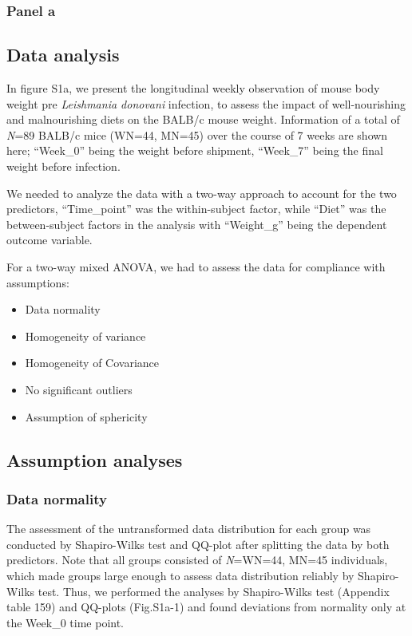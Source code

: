 \documentclass[
  12pt,
  letterpaper,
]{article}
\providecommand{\tightlist}{%
  \setlength{\itemsep}{0pt}\setlength{\parskip}{0pt}}
\begin{document}
\subsubsection{Panel a}\label{panel-a-3}

\subsection{Data analysis}\label{data-analysis-10}

In figure S1a, we present the longitudinal weekly observation of mouse body weight pre \emph{Leishmania donovani} infection, to assess the impact of well-nourishing and malnourishing diets on the BALB/c mouse weight. Information of a total of \emph{N}=89 BALB/c mice (WN=44, MN=45) over the course of 7 weeks are shown here; ``Week\_0'' being the weight before shipment, ``Week\_7'' being the final weight before infection.

We needed to analyze the data with a two-way approach to account for the two predictors, ``Time\_point'' was the within-subject factor, while ``Diet'' was the between-subject factors in the analysis with ``Weight\_g'' being the dependent outcome variable.

For a two-way mixed ANOVA, we had to assess the data for compliance with assumptions:

\begin{itemize}
\tightlist
\item
  Data normality
\item
  Homogeneity of variance
\item
  Homogeneity of Covariance
\item
  No significant outliers
\item
  Assumption of sphericity
\end{itemize}

\subsection{Assumption analyses}\label{assumption-analyses-6}

\subsubsection{Data normality}\label{data-normality-6}

The assessment of the untransformed data distribution for each group was conducted by Shapiro-Wilks test and QQ-plot after splitting the data by both predictors. Note that all groups consisted of \emph{N}=WN=44, MN=45 individuals, which made groups large enough to assess data distribution reliably by Shapiro-Wilks test. Thus, we performed the analyses by Shapiro-Wilks test (Appendix table 159) and QQ-plots (Fig.S1a-1) and found deviations from normality only at the Week\_0 time point.
\end{document}
